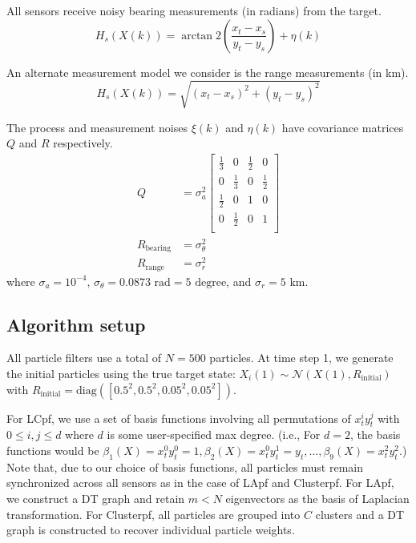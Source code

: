 \documentclass[10pt,letterpaper,final]{article}
\begin{document}
All sensors receive noisy bearing measurements (in radians) from the target.
\begin{equation}
H_s(X(k))= \arctan2 \left( \frac{x_t-x_s}{y_t-y_s} \right) + \eta(k)
\end{equation}

An alternate measurement model we consider is the range measurements (in km).
\begin{equation}
H_s(X(k)) = \sqrt{(x_t-x_s)^2+(y_t-y_s)^2}
\end{equation}

The process and measurement noises $\xi(k)$ and $\eta(k)$ have covariance matrices $Q$ and $R$ respectively.
\begin{align}
Q &= \sigma_a^2
\left[
\begin{array}{cccc}
\frac{1}{3} & 0 & \frac{1}{2} & 0 \\
0 & \frac{1}{3} & 0 & \frac{1}{2} \\
\frac{1}{2} & 0 & 1 & 0 \\
0 & \frac{1}{2} & 0 & 1 \\
\end{array}
\right]\\
R_{\text{bearing}} &= \sigma_{\theta}^2 \\
R_{\text{range}} &= \sigma_{r}^2
\end{align}
where $\sigma_a=10^{-4}$, $\sigma_{\theta}=0.0873\text{ rad} = 5 \text{ degree}$, and $\sigma_{r}= 5 \text{ km}$.


\subsection{Algorithm setup}
All particle filters use a total of $N=500$ particles. At time step 1, we generate the initial particles using the true target state: $X_i(1) \sim \mathcal{N}(X(1), R_{\text{initial}})$ with $R_{\text{initial}}=\text{diag}([0.5^2,0.5^2,0.05^2,0.05^2])$. 

For LCpf, we use a set of basis functions involving all permutations of $x_t^iy_t^j$ with $0\leq i, j \leq d$ where $d$ is some user-specified max degree. (i.e., For $d=2$, the basis functions would be $\beta_1(X) = x_t^0 y_t^0 = 1, \beta_2(X) = x_t^0 y_t^1 = y_t, ..., \beta_9(X) = x_t^2 y_t^2 $.) Note that, due to our choice of basis functions, all particles must remain synchronized across all sensors as in the case of LApf and Clusterpf. For LApf, we construct a DT graph and retain $m< N$ eigenvectors as the basis of Laplacian transformation. For Clusterpf, all particles are grouped into $C$ clusters and a DT graph is constructed to recover individual particle weights. 
\end{document}
